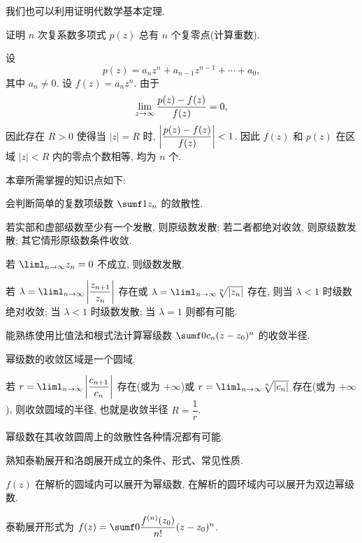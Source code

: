 我们也可以利用\thmRouche 证明代数学基本定理.
\begin{example}[代数学基本定理]
	证明 $n$ 次复系数多项式 $p(z)$ 总有 $n$ 个复零点(计算重数).
\end{example}

\begin{solution}
  设
  \[
    p(z)=a_nz^n+a_{n-1}z^{n-1}+\cdots+a_0,
  \]
  其中 $a_n\neq 0$.
  设 $f(z)=a_n z^n$.
  由于
  \[
    \lim_{z\rightarrow\infty}\frac{p(z)-f(z)}{f(z)}=0,
  \]
  因此存在 $R>0$ 使得当 $|z|=R$ 时, $\left|\dfrac{p(z)-f(z)}{f(z)}\right|<1$.
  因此 $f(z)$ 和 $p(z)$ 在区域 $|z|<R$ 内的零点个数相等, 均为 $n$ 个.
\end{solution}




本章所需掌握的知识点如下:
\begin{conclusion}
  \item 会判断简单的复数项级数 $\sumf1z_n$ 的敛散性.
  \begin{conclusion}
    \item 若实部和虚部级数至少有一个发散, 则原级数发散; 若二者都绝对收敛, 则原级数发散; 其它情形原级数条件收敛.
    \item 若 $\liml_{n\ra\infty} z_n=0$ 不成立, 则级数发散.
    \item 若 $\lambda=\liml_{n\ra\infty}\abs{\dfrac{z_{n+1}}{z_n}}$ 存在或 $\lambda=\liml_{n\ra\infty}\sqrt[n]{|z_n|}$ 存在, 则当 $\lambda<1$ 时级数绝对收敛; 当 $\lambda<1$ 时级数发散; 当 $\lambda=1$ 则都有可能.
  \end{conclusion}
  \item 能熟练使用比值法和根式法计算幂级数 $\sumf0c_n(z-z_0)^n$ 的收敛半径.
  \begin{conclusion}
    \item 幂级数的收敛区域是一个圆域.
    \item 若 $r=\liml_{n\ra\infty}\abs{\dfrac{c_{n+1}}{c_n}}$ 存在(或为 $+\infty$)或 $r=\liml_{n\ra\infty}\sqrt[n]{|c_n|}$ 存在(或为 $+\infty$), 则收敛圆域的半径, 也就是收敛半径 $R=\dfrac1r$.
    \item 幂级数在其收敛圆周上的敛散性各种情况都有可能.
  \end{conclusion}
  \item 熟知泰勒展开和洛朗展开成立的条件、形式、常见性质.
  \begin{conclusion}
    \item $f(z)$ 在解析的圆域内可以展开为幂级数, 在解析的圆环域内可以展开为双边幂级数.
    \item 泰勒展开形式为 $f(z)=\sumf0 \dfrac{f^{(n)}(z_0)}{n!}(z-z_0)^n$.

\end{conclusion}
\end{conclusion}
